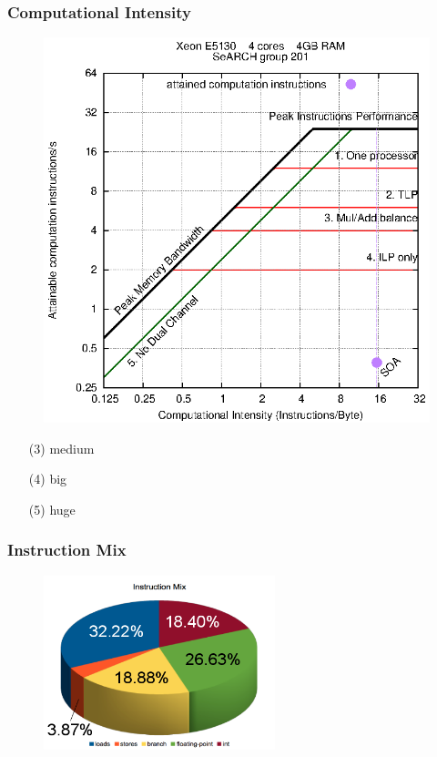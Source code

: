 \documentclass{beamer}
\begin{document}
\begin{frame}
	\frametitle{Computational Intensity}
	\begin{minipage}{0.78\textwidth}
		\begin{figure}
			\begin{center}
				\includegraphics[width=\textwidth]{images/roofline/201.eps}
			\end{center}
		\end{figure}
	\end{minipage}
	\begin{minipage}{0.2\textwidth}
		\begin{itemize}
			\item[(3)]{medium}
			\item[(4)]{big}
			\item[(5)]{huge}
		\end{itemize}
	\end{minipage}
\end{frame}

\begin{frame}
	\frametitle{Instruction Mix}
	\begin{figure}
		\begin{center}
			\includegraphics[width=0.6\textwidth]{images/slides.march/instmx.png}
		\end{center}
	\end{figure}
\end{frame}
\end{document}
